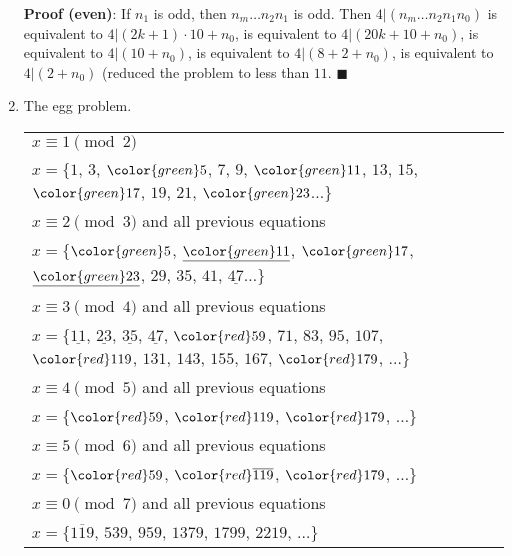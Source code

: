 \documentclass[12pt,letterpaper]{article}
\newcommand{\qedhere}{{\tiny \(\blacksquare\)}}
\begin{document}
\begin{enumerate}[leftmargin=0mm]
\textbf{Proof (even)}: If \(n_1\) is odd, then \(n_m \dots n_2 n_1\) is odd. Then \(4|(n_m \dots n_2 n_1 n_0)\) is equivalent to \(4|(2k + 1) \cdot 10 + n_0\), is equivalent to \(4|(20k + 10 + n_0)\), is equivalent to \(4|(10 + n_0)\), is equivalent to \(4|(8 + 2 + n_0)\), is equivalent to \(4|(2 + n_0)\) (reduced the problem to less than \(11\). \qedhere

\item The egg problem.

\begin{tabular}[t]{l l}
\(x \equiv 1 \pmod {2}\) \\
\quad\quad\quad \(x = \{\)\(1\), \(3\), \(\color{green}5\), \(7\), \(9\), \(\color{green}11\), \(13\), \(15\), \(\color{green}17\), \(19\), \(21\), \(\color{green}23\)\(\dots\}\) \\
\(x \equiv 2 \pmod {3}\) and all previous equations \\
\quad\quad\quad \(x = \{\)\(\color{green}5\), \(\underline{\color{green}11}\), \(\color{green}17\), \(\underline{\color{green}23}\), \(29\), \(35\), \(41\), \(\underline{47}\)\(\dots\}\) \\
\(x \equiv 3 \pmod {4}\) and all previous equations \\
\quad\quad\quad \(x = \{\)\(\underline{11}\), \(\underline{23}\), \(\underline{35}\), \(\underline{47}\), \(\color{red}59\), \(71\), \(83\), \(95\), \(107\), \(\color{red}119\), \(131\), \(143\), \(155\), \(167\), \(\color{red}179\), \(\dots\}\) \\
\(x \equiv 4 \pmod {5}\) and all previous equations \\
\quad\quad\quad \(x = \{\)\(\color{red}59\), \(\color{red}119\), \(\color{red}179\), \(\dots\}\) \\
\(x \equiv 5 \pmod {6}\) and all previous equations \\
\quad\quad\quad \(x = \{\)\(\color{red}59\), \(\color{red}\overline{119}\), \(\color{red}179\), \(\dots\}\) \\
\(x \equiv 0 \pmod {7}\) and all previous equations \\
\quad\quad\quad \(x = \{\)\(\overline{119}\), \(539\), \(959\), \(1379\), \(1799\), \(2219\), \(\dots\}\) \\
\end{tabular}


\end{enumerate}
\end{document}
